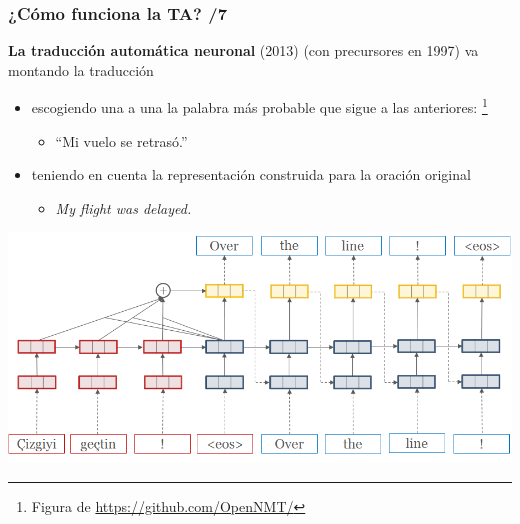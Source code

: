 \documentclass{beamer}
\begin{document}
\begin{frame}
\frametitle{¿Cómo funciona la TA? /7}
\textbf{La traducción automática neuronal} (2013) (con precursores en 1997)\pause{}
 va montando la traducción
\begin{itemize}\pause
\item escogiendo una a una la palabra más probable que sigue a las anteriores: \footnote{Figura de \url{https://github.com/OpenNMT/}}\pause
  \begin{itemize}
  \item ``Mi \pause vuelo \pause se \pause retrasó\pause.''
  \end{itemize}
\item teniendo en cuenta la representación construida para la oración original
  \begin{itemize}
  \item \emph{My flight was delayed.}\pause
  \end{itemize}
\end{itemize}
\begin{center}
\includegraphics[scale=0.3]{nmt.png}
\end{center}

\end{frame}
\end{document}
